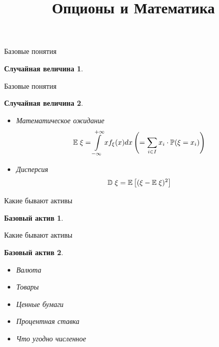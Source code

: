 \documentclass{beamer}
\title[Опционы и Математика]{Опционы и Математика} %
\institute[Сбер] %
    {
        \\

        \centering\Large{Ваня Воробьев}\\
        \vspace{0.5cm}
        \begin{center}
            \small
            \href{https://t.me/v0r0bi0v}{t.me/v0r0bi0v} | \href{tel:+79779996957}{+79779996957} | \href{mailto:ievorobev@edu.hse.ru}{IEVorobyev@sberbank.ru}
        \end{center}
    }
\newtheorem*{randomvariable*}{Случайная величина}
\newtheorem{underlying*}{Базовый актив}
\newcommand{\E}{\ensuremath{\mathbb{E}}}
\newcommand{\D}{\ensuremath{\mathbb{D}}}
\renewcommand{\P}{\ensuremath{\mathbb{P}}}
\begin{document}
        \begin{frame}
            \titlepage
        \end{frame}

        \begin{frame}{Базовые понятия}
            \begin{randomvariable*}

            \end{randomvariable*}
        \end{frame}

        \begin{frame}{Базовые понятия}
            \begin{randomvariable*}
                \begin{itemize}
                    \item Математическое ожидание
                    \[
                        \E \hspace{0.1cm}\xi = \int\limits_{-\infty}^{+\infty} xf_{\xi}(x) dx \left( = \sum\limits_{i\in I} x_i \cdot \P(\xi = x_i) \right)
                    \]
                    \item Дисперсия
                    \[
                        \D \hspace{0.1cm}\xi = \E\left[(\xi - \E\hspace{0.1cm} \xi)^2\right]
                    \]
                \end{itemize}
            \end{randomvariable*}
        \end{frame}

        \begin{frame}{Какие бывают активы}
            \begin{underlying*}
            \end{underlying*}
        \end{frame}

        \begin{frame}{Какие бывают активы}
            \begin{underlying*}
                \begin{itemize}
                    \item Валюта
                    \item Товары
                    \item Ценные бумаги
                    \item Процентная ставка
                    \item Что угодно численное
                \end{itemize}
            \end{underlying*}
        \end{frame}
\end{document}
